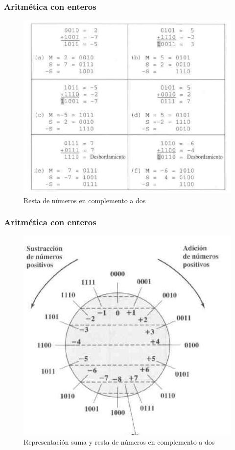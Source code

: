 \documentclass{beamer}
\begin{document}
\begin{frame}
	\frametitle{Aritmética con enteros}
	\begin{figure}[H]
		\centering
		\includegraphics[scale=0.45]{imagenes/resta.png}
		\caption{Resta de números en complemento a dos}
	\end{figure}
\end{frame}


\begin{frame}
	\frametitle{Aritmética con enteros}
	\begin{figure}[H]
		\centering
		\includegraphics[scale=0.4]{imagenes/representacion.png}
		\caption{Representación suma y resta de números en complemento a dos}
	\end{figure}
\end{frame}
\end{document}
